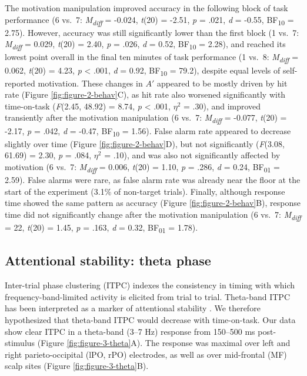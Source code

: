 \documentclass[11pt,]{memoir}
\begin{document}
The motivation manipulation improved accuracy in the following block of task performance (6 vs.~7: \emph{M\textsubscript{diff}} = -0.024, \emph{t}(20) = -2.51, \emph{p} = .021, \emph{d} = -0.55, BF\textsubscript{10} = 2.75). However, accuracy was still significantly lower than the first block (1 vs.~7: \emph{M\textsubscript{diff}} = 0.029, \emph{t}(20) = 2.40, \emph{p} = .026, \emph{d} = 0.52, BF\textsubscript{10} = 2.28), and reached its lowest point overall in the final ten minutes of task performance (1 vs.~8: \emph{M\textsubscript{diff}} = 0.062, \emph{t}(20) = 4.23, \emph{p} \textless{} .001, \emph{d} = 0.92, BF\textsubscript{10} = 79.2), despite equal levels of self-reported motivation. These changes in \(A'\) appeared to be mostly driven by hit rate (Figure \ref{fig:figure-2-behav}C), as hit rate also worsened significantly with time-on-task (\emph{F}(2.45, 48.92) = 8.74, \emph{p} \textless{} .001, \(\eta^2\) = .30), and improved transiently after the motivation manipulation (6 vs.~7: \emph{M\textsubscript{diff}} = -0.077, \emph{t}(20) = -2.17, \emph{p} = .042, \emph{d} = -0.47, BF\textsubscript{10} = 1.56). False alarm rate appeared to decrease slightly over time (Figure \ref{fig:figure-2-behav}D), but not significantly (\emph{F}(3.08, 61.69) = 2.30, \emph{p} = .084, \(\eta^2\) = .10), and was also not significantly affected by motivation (6 vs.~7: \emph{M\textsubscript{diff}} = 0.006, \emph{t}(20) = 1.10, \emph{p} = .286, \emph{d} = 0.24, BF\textsubscript{01} = 2.59). False alarms were rare, as false alarm rate was already near the floor at the start of the experiment (3.1\% of non-target trials). Finally, although response time showed the same pattern as accuracy (Figure \ref{fig:figure-2-behav}B), response time did not significantly change after the motivation manipulation (6 vs.~7: \emph{M\textsubscript{diff}} = 22, \emph{t}(20) = 1.45, \emph{p} = .163, \emph{d} = 0.32, BF\textsubscript{01} = 1.78).

\hypertarget{attentional-stability-theta-phase}{%
\subsection{Attentional stability: theta phase}\label{attentional-stability-theta-phase}}

Inter-trial phase clustering (ITPC) indexes the consistency in timing with which frequency-band-limited activity is elicited from trial to trial. Theta-band ITPC has been interpreted as a marker of attentional stability \autocite{Lutz2009}. We therefore hypothesized that theta-band ITPC would decrease with time-on-task. Our data show clear ITPC in a theta-band (3--7 Hz) response from 150--500 ms post-stimulus (Figure \ref{fig:figure-3-theta}A). The response was maximal over left and right parieto-occipital (lPO, rPO) electrodes, as well as over mid-frontal (MF) scalp sites (Figure \ref{fig:figure-3-theta}B).
\end{document}
